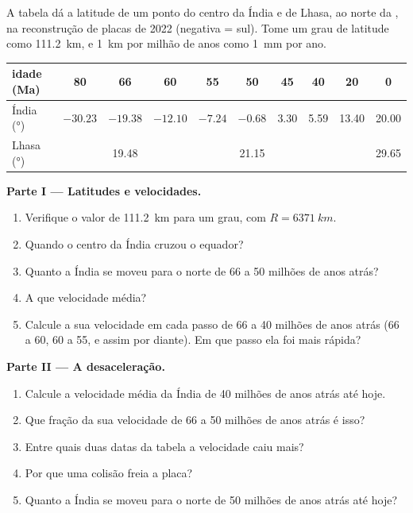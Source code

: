 \begin{problem}
\label{pb:g12:mountain-building:1}
A tabela dá a latitude de um ponto do centro da Índia e de Lhasa, ao norte
da , na reconstrução de placas de 2022 (negativa = sul). Tome um grau
de latitude como \qty{111.2}{km}, e \qty{1}{km} por milhão de anos como
\qty{1}{mm} por ano.

\begin{center}
\small
\begin{tabular}{|l|c|c|c|c|c|c|c|c|c|}
\hline
idade (\unit{Ma}) & 80 & 66 & 60 & 55 & 50 & 45 & 40 & 20 & 0 \\ \hline
Índia (\unit{\degree}) & $-30.23$ & $-19.38$ & $-12.10$ & $-7.24$ & $-0.68$ & 3.30 & 5.59 & 13.40 & 20.00 \\ \hline
Lhasa (\unit{\degree}) & & 19.48 & & & 21.15 & & & & 29.65 \\ \hline
\end{tabular}
\end{center}

\medskip
\noindent\textbf{Parte I --- Latitudes e velocidades.}
\begin{enumerate}
  \item Verifique o valor de \qty{111.2}{km} para um grau, com $R =
        \qty{6371}{km}$.
  \item Quando o centro da Índia cruzou o equador?
  \item Quanto a Índia se moveu para o norte de 66 a 50 milhões de anos
        atrás?
  \item A que velocidade média?
  \item Calcule a sua velocidade em cada passo de 66 a 40 milhões de anos
        atrás (66 a 60, 60 a 55, e assim por diante). Em que passo ela foi
        mais rápida?
\end{enumerate}

\medskip
\noindent\textbf{Parte II --- A desaceleração.}
\begin{enumerate}[resume]
  \item Calcule a velocidade média da Índia de 40 milhões de anos atrás até
        hoje.
  \item Que fração da sua velocidade de 66 a 50 milhões de anos atrás é
        isso?
  \item Entre quais duas datas da tabela a velocidade caiu mais?
  \item Por que uma colisão freia a placa?
  \item Quanto a Índia se moveu para o norte de 50 milhões de anos atrás até
        hoje?
\end{enumerate}


\end{problem}
